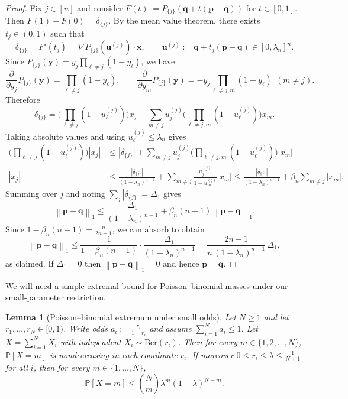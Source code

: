 \documentclass[11pt]{amsart}
\numberwithin{equation}{section}
\newtheorem{lemma}[theorem]{Lemma}
\theoremstyle{definition}
\newcommand{\abs}[1]{\left|#1\right|}
\newcommand{\vct}[1]{\mathbf{#1}}
\newcommand{\pvec}{\vct{p}}
\newcommand{\qvec}{\vct{q}}
\newcommand{\xvec}{\vct{x}}
\newcommand{\yvec}{\vct{y}}
\newcommand{\uvec}{\vct{u}}
\newcommand{\normone}[1]{\left\lVert #1 \right\rVert_1}
\newcommand{\lam}{\lambda}
\begin{document}
\begin{proof}
Fix $j\in[n]$ and consider $F(t):=P_{\{j\}}(\qvec+t(\pvec-\qvec))$ for $t\in[0,1]$.
Then $F(1)-F(0)=\delta_{\{j\}}$.
By the mean value theorem, there exists $t_j\in(0,1)$ such that
\[
\delta_{\{j\}}=F'(t_j)=\nabla P_{\{j\}}(\uvec^{(j)})\cdot\xvec,
\qquad
\uvec^{(j)}:=\qvec+t_j(\pvec-\qvec)\in[0,\lam_n]^n.
\]
Since $P_{\{j\}}(\yvec)=y_j\prod_{\ell\neq j}(1-y_\ell)$, we have
\[
\frac{\partial}{\partial y_j}P_{\{j\}}(\yvec)=\prod_{\ell\neq j}(1-y_\ell),
\qquad
\frac{\partial}{\partial y_m}P_{\{j\}}(\yvec)=-y_j\prod_{\ell\neq j,m}(1-y_\ell)\ \ (m\neq j).
\]
Therefore
\[
\delta_{\{j\}}
=\Big(\prod_{\ell\neq j}(1-u^{(j)}_\ell)\Big)x_j
-\sum_{m\neq j}u^{(j)}_j\Big(\prod_{\ell\neq j,m}(1-u^{(j)}_\ell)\Big)x_m.
\]
Taking absolute values and using $u^{(j)}_\ell\le \lam_n$ gives
\begin{align*}
\Big(\prod_{\ell\neq j}(1-u^{(j)}_\ell)\Big)\abs{x_j}
&\le \abs{\delta_{\{j\}}}+
\sum_{m\neq j}u^{(j)}_j\Big(\prod_{\ell\neq j,m}(1-u^{(j)}_\ell)\Big)\abs{x_m}\\
\abs{x_j}
&\le \frac{\abs{\delta_{\{j\}}}}{(1-\lam_n)^{n-1}}+
\sum_{m\neq j}\frac{u^{(j)}_j}{1-u^{(j)}_m}\abs{x_m}
\le \frac{\abs{\delta_{\{j\}}}}{(1-\lam_n)^{n-1}}+\beta_n\sum_{m\neq j}\abs{x_m}.
\end{align*}
Summing over $j$ and noting $\sum_j\abs{\delta_{\{j\}}}=\Delta_1$ gives
\[
\normone{\pvec-\qvec}
\le \frac{\Delta_1}{(1-\lam_n)^{n-1}}+\beta_n(n-1)\normone{\pvec-\qvec}.
\]
Since $1-\beta_n(n-1)=\frac{n}{2n-1}$, we can absorb to obtain
\[
\normone{\pvec-\qvec}\le \frac{1}{1-\beta_n(n-1)}\cdot\frac{\Delta_1}{(1-\lam_n)^{n-1}}
=\frac{2n-1}{n\,(1-\lam_n)^{n-1}}\,\Delta_1,
\]
as claimed.
If $\Delta_1=0$ then $\normone{\pvec-\qvec}=0$ and hence $\pvec=\qvec$.
\end{proof}

We will need a simple extremal bound for Poisson--binomial masses under our small-parameter restriction.

\begin{lemma}[Poisson--binomial extremum under small odds]\label{lem:pb_extremum}
Let $N\ge 1$ and let $r_1,\dots,r_N\in[0,1)$.
Write odds $a_i:=\frac{r_i}{1-r_i}$ and assume $\sum_{i=1}^N a_i\le 1$.
Let $X=\sum_{i=1}^N X_i$ with independent $X_i\sim\mathrm{Ber}(r_i)$.
Then for every $m\in\{1,2,\dots,N\}$, $\mathbb{P}[X=m]$ is nondecreasing in each coordinate $r_i$.
If moreover $0\le r_i\le \lam\le \frac{1}{N+1}$ for all $i$, then for every $m\in\{1,\dots,N\}$,
\[
\mathbb{P}[X=m]\le \binom{N}{m}\lam^{m}(1-\lam)^{N-m}.
\]
\end{lemma}
\end{document}
